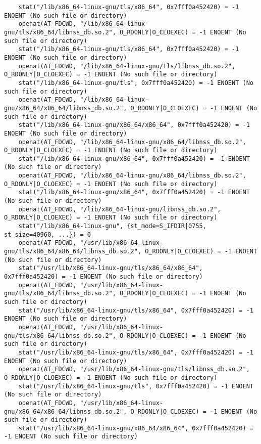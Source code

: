 \documentclass[pdf, unicode, 12pt, a4paper,oneside,fleqn]{article}
\begin{document}
{\begin{verbatim}
    stat("/lib/x86_64-linux-gnu/tls/x86_64", 0x7fff0a452420) = -1 ENOENT (No such file or directory)
    openat(AT_FDCWD, "/lib/x86_64-linux-gnu/tls/x86_64/libnss_db.so.2", O_RDONLY|O_CLOEXEC) = -1 ENOENT (No such file or directory)
    stat("/lib/x86_64-linux-gnu/tls/x86_64", 0x7fff0a452420) = -1 ENOENT (No such file or directory)
    openat(AT_FDCWD, "/lib/x86_64-linux-gnu/tls/libnss_db.so.2", O_RDONLY|O_CLOEXEC) = -1 ENOENT (No such file or directory)
    stat("/lib/x86_64-linux-gnu/tls", 0x7fff0a452420) = -1 ENOENT (No such file or directory)
    openat(AT_FDCWD, "/lib/x86_64-linux-gnu/x86_64/x86_64/libnss_db.so.2", O_RDONLY|O_CLOEXEC) = -1 ENOENT (No such file or directory)
    stat("/lib/x86_64-linux-gnu/x86_64/x86_64", 0x7fff0a452420) = -1 ENOENT (No such file or directory)
    openat(AT_FDCWD, "/lib/x86_64-linux-gnu/x86_64/libnss_db.so.2", O_RDONLY|O_CLOEXEC) = -1 ENOENT (No such file or directory)
    stat("/lib/x86_64-linux-gnu/x86_64", 0x7fff0a452420) = -1 ENOENT (No such file or directory)
    openat(AT_FDCWD, "/lib/x86_64-linux-gnu/x86_64/libnss_db.so.2", O_RDONLY|O_CLOEXEC) = -1 ENOENT (No such file or directory)
    stat("/lib/x86_64-linux-gnu/x86_64", 0x7fff0a452420) = -1 ENOENT (No such file or directory)
    openat(AT_FDCWD, "/lib/x86_64-linux-gnu/libnss_db.so.2", O_RDONLY|O_CLOEXEC) = -1 ENOENT (No such file or directory)
    stat("/lib/x86_64-linux-gnu", {st_mode=S_IFDIR|0755, st_size=40960, ...}) = 0
    openat(AT_FDCWD, "/usr/lib/x86_64-linux-gnu/tls/x86_64/x86_64/libnss_db.so.2", O_RDONLY|O_CLOEXEC) = -1 ENOENT (No such file or directory)
    stat("/usr/lib/x86_64-linux-gnu/tls/x86_64/x86_64", 0x7fff0a452420) = -1 ENOENT (No such file or directory)
    openat(AT_FDCWD, "/usr/lib/x86_64-linux-gnu/tls/x86_64/libnss_db.so.2", O_RDONLY|O_CLOEXEC) = -1 ENOENT (No such file or directory)
    stat("/usr/lib/x86_64-linux-gnu/tls/x86_64", 0x7fff0a452420) = -1 ENOENT (No such file or directory)
    openat(AT_FDCWD, "/usr/lib/x86_64-linux-gnu/tls/x86_64/libnss_db.so.2", O_RDONLY|O_CLOEXEC) = -1 ENOENT (No such file or directory)
    stat("/usr/lib/x86_64-linux-gnu/tls/x86_64", 0x7fff0a452420) = -1 ENOENT (No such file or directory)
    openat(AT_FDCWD, "/usr/lib/x86_64-linux-gnu/tls/libnss_db.so.2", O_RDONLY|O_CLOEXEC) = -1 ENOENT (No such file or directory)
    stat("/usr/lib/x86_64-linux-gnu/tls", 0x7fff0a452420) = -1 ENOENT (No such file or directory)
    openat(AT_FDCWD, "/usr/lib/x86_64-linux-gnu/x86_64/x86_64/libnss_db.so.2", O_RDONLY|O_CLOEXEC) = -1 ENOENT (No such file or directory)
    stat("/usr/lib/x86_64-linux-gnu/x86_64/x86_64", 0x7fff0a452420) = -1 ENOENT (No such file or directory)

\end{verbatim}}
\end{document}

